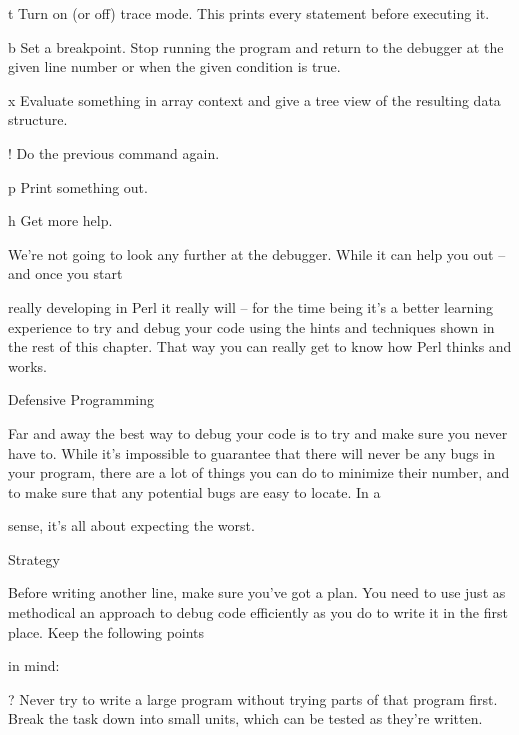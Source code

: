 \documentclass[a4paper,11pt]{book}
\begin{document}
\noindent t Turn on (or off) trace mode. This prints every statement before executing it.

\noindent 

\noindent b Set a breakpoint. Stop running the program and return to the debugger at the given line number or when the given condition is true.

\noindent x Evaluate something in array context and give a tree view of the resulting data structure.

\noindent ! Do the previous command again.

\noindent 

\noindent p Print something out.

\noindent 

\noindent h Get more help.

\noindent 

\noindent 

\noindent We're not going to look any further at the debugger. While it can help you out -- and once you start

\noindent really developing in Perl it really will -- for the time being it's a better learning experience to try and debug your code using the hints and techniques shown in the rest of this chapter. That way you can really get to know how Perl thinks and works.

\noindent 

\noindent 

\noindent Defensive Programming

\noindent 

\noindent Far and away the best way to debug your code is to try and make sure you never have to. While it's impossible to guarantee that there will never be any bugs in your program, there are a lot of things you can do to minimize their number, and to make sure that any potential bugs are easy to locate. In a

\noindent sense, it's all about expecting the worst.

\noindent Strategy

\noindent 

\noindent Before writing another line,  make  sure  you've  got  a  plan.  You  need  to  use just  as  methodical  an approach to  debug  code efficiently  as  you  do  to  write  it  in  the first  place.  Keep  the following  points

\noindent in mind:

\noindent 

\noindent ? Never try to write a large program without trying parts of that program first. Break the task down into small units, which can be tested as they're written.
\end{document}
